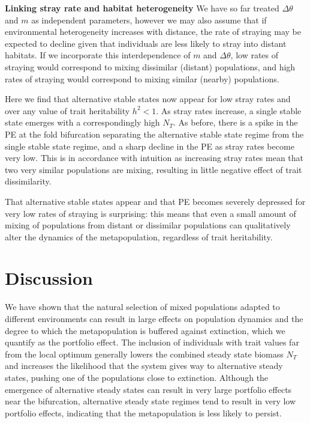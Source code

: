 \documentclass[twocolumn,preprintnumbers,amsmath,amssymb,superscriptaddress]{revtex4}
\begin{document}
{\bf Linking stray rate and habitat heterogeneity} We have so far treated $\Delta\theta$ and $m$ as independent parameters, however we may also assume that if environmental heterogeneity increases with distance, the rate of straying may be expected to decline given that individuals are less likely to stray into distant habitats. %
If we incorporate this interdependence of $m$ and $\Delta\theta$, low rates of straying would correspond to mixing dissimilar (distant) populations, and high rates of straying would correspond to mixing similar (nearby) populations.

Here we find that alternative stable states now appear for low stray rates and over any value of trait heritability $h^2<1$.
As stray rates increase, a single stable state emerges with a correspondingly high $N_T$.
As before, there is a spike in the PE at the fold bifurcation separating the alternative stable state regime from the single stable state regime, and a sharp decline in the PE as stray rates become very low.
This is in accordance with intuition as increasing stray rates mean that two very similar populations are mixing, resulting in little negative effect of trait dissimilarity.

That alternative stable states appear and that PE becomes severely depressed for very low rates of straying is surprising: this means that even a small amount of mixing of populations from distant or dissimilar populations can qualitatively alter the dynamics of the metapopulation, regardless of trait heritability.


\section*{Discussion}

We have shown that the natural selection of mixed populations adapted to different environments can result in large effects on population dynamics and the degree to which the metapopulation is buffered against extinction, which we quantify as the portfolio effect.
The inclusion of individuals with trait values far from the local optimum generally lowers the combined steady state biomass $N_T$ and increases the likelihood that the system gives way to alternative steady states, pushing one of the populations close to extinction.
Although the emergence of alternative steady states can result in very large portfolio effects near the bifurcation, alternative steady state regimes tend to result in very low portfolio effects, indicating that the metapopulation is less likely to persist.
\end{document}
